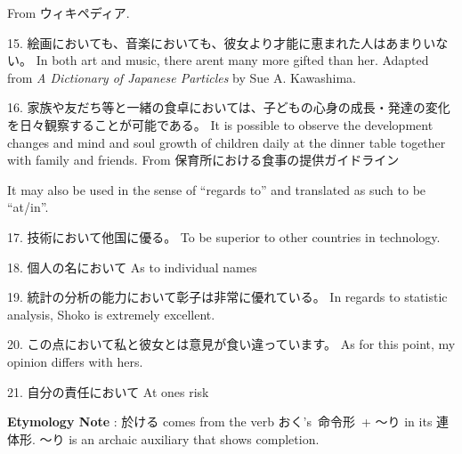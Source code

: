 \par{From ウィキペディア. }
 
\par{15. 絵画においても、音楽においても、彼女より才能に恵まれた人はあまりいない。 \hfill\break
In both art and music, there aren\textquotesingle t many more gifted than her. \hfill\break
Adapted from \emph{A Dictionary of Japanese Particles }by Sue A. Kawashima. }
 
\par{16. 家族や友だち等と一緒の食卓においては、子どもの心身の成長・発達の変化を日々観察することが可能である。 \hfill\break
It is possible to observe the development changes and mind and soul growth of children daily at the dinner table together with family and friends. \hfill\break
From 保育所における食事の提供ガイドライン }
 
\par{ It may also be used in the sense of “regards to” and translated as such to be “at\slash in”. }
 
\par{17. 技術において他国に優る。 \hfill\break
To be superior to other countries in technology. }
 
\par{18. 個人の名において \hfill\break
As to individual names \hfill\break
 }

\par{19. 統計の分析の能力において彰子は非常に優れている。 \hfill\break
In regards to statistic analysis, Shoko is extremely excellent. }
 
\par{20. この点において私と彼女とは意見が食い違っています。 \hfill\break
As for this point, my opinion differs with hers. }
 
\par{21. 自分の責任において \hfill\break
At one\textquotesingle s risk }
 
\par{\textbf{Etymology Note }: 於ける comes from the verb おく's 命令形 + ～り in its 連体形. ～り is an archaic auxiliary that shows completion. }
    
